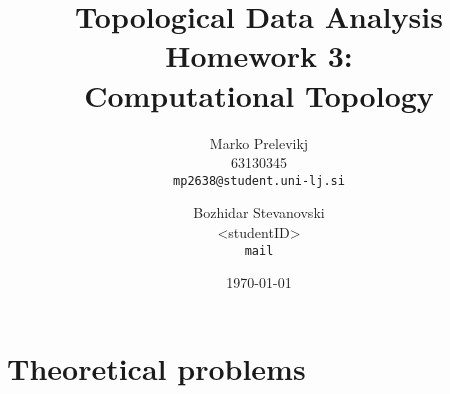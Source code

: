 \documentclass[fleqn]{article}
\title{
Topological Data Analysis \\
Homework 3: \\
Computational Topology
}
\author{
Marko Prelevikj\\
63130345\\
\texttt{mp2638@student.uni-lj.si}
\and
Bozhidar Stevanovski\\
<studentID>\\
\texttt{mail}
}
\date{\today}
\begin{document}
\maketitle
\section{Theoretical problems} \label{theory}
\end{document}
